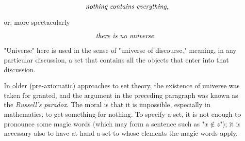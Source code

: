 \begin{equation*}
\text{ \textit{nothing contains everything,}}
\end{equation*}

or, more spectacularly

\begin{equation*}
\text{\textit{there is no universe.}}
\end{equation*}

"Universe" here is used in the sense of "universe of discourse," meaning, in any particular discussion, a set that contains all the objects that enter into that discussion. 

In older (pre-axiomatic) approaches to set theory, the existence of universe was taken for granted, and the argument in the preceding paragraph was known as the \textit{Russell's paradox}. The moral is that it is impossible, especially in mathematics, to get something for nothing. To specify a set, it is not enough to pronounce some magic words (which may form a sentence such as "$x \notin z$"); it is necessary also to have at hand a set to whose elements the magic words apply. 
